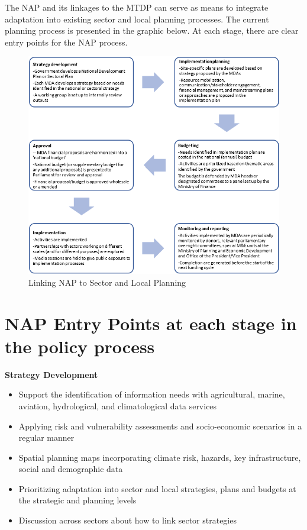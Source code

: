 \documentclass[
]{book}
\providecommand{\tightlist}{%
  \setlength{\itemsep}{0pt}\setlength{\parskip}{0pt}}
\begin{document}
The NAP and its linkages to the MTDP can serve as means to integrate adaptation into existing sector and local planning processes. The current planning process is presented in the graphic below. At each stage, there are clear entry points for the NAP process.

\begin{figure}
\centering
\includegraphics{images/linking nap.png}
\caption{Linking NAP to Sector and Local Planning}
\end{figure}

\hypertarget{nap-entry-points-at-each-stage-in-the-policy-process}{%
\section{NAP Entry Points at each stage in the policy process}\label{nap-entry-points-at-each-stage-in-the-policy-process}}

\textbf{Strategy Development}

\begin{itemize}
\tightlist
\item
  Support the identification of information needs with agricultural, marine, aviation, hydrological, and climatological data services
\item
  Applying risk and vulnerability assessments and socio-economic scenarios in a regular manner
\item
  Spatial planning maps incorporating climate risk, hazards, key infrastructure, social and demographic data
\item
  Prioritizing adaptation into sector and local strategies, plans and budgets at the strategic and planning levels
\item
  Discussion across sectors about how to link sector strategies
\end{itemize}
\end{document}
